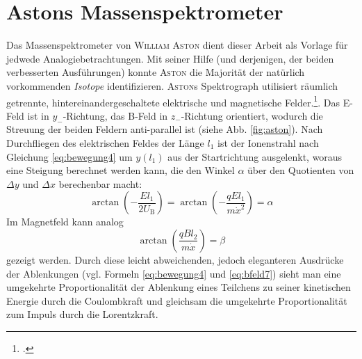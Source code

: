 \section{Astons Massenspektrometer}
\label{sec:aston}
Das Massenspektrometer von \textsc{William Aston} dient dieser Arbeit als Vorlage für jedwede Analogiebetrachtungen. Mit seiner Hilfe (und derjenigen, der beiden verbesserten Ausführungen) konnte \textsc{Aston} die Majorität der natürlich vorkommenden \textit{Isotope} identifizieren.
\textsc{Aston}s Spektrograph utilisiert räumlich getrennte, hintereinandergeschaltete elektrische und magnetische Felder.\footcite[die nachfolgende Herleitung ist in weiten Teilen eine Paraphrasierung von][S.\,51--52]{Demtroeder2010}. Das E-Feld ist in $y_-$-Richtung, das B-Feld in $z_-$-Richtung orientiert, wodurch die Streuung der beiden Feldern anti-parallel ist (siehe Abb. \ref{fig:aston}).
Nach Durchfliegen des elektrischen Feldes der Länge $l_1$ ist der Ionenstrahl nach Gleichung \eqref{eq:bewegung4} um $y(l_1)$ aus der Startrichtung ausgelenkt, woraus eine Steigung berechnet werden kann, die den Winkel $\alpha$ über den Quotienten von $\Delta y$ und $\Delta x$ berechenbar macht:
\begin{equation}
\label{eq:aston1}
\arctan(-\frac{El_1}{2U_\mathrm{B}})=\arctan(-\frac{qEl_1}{m\dot{x}^2})=\alpha
\end{equation}
Im Magnetfeld kann analog
\begin{equation}
\label{eq:aston2}
\arctan(\frac{qBl_2}{m\dot{x}})=\beta
\end{equation}
gezeigt werden. Durch diese leicht abweichenden, jedoch eleganteren Ausdrücke der Ablenkungen (vgl. Formeln \eqref{eq:bewegung4} und \eqref{eq:bfeld7}) sieht man eine umgekehrte Proportionalität der Ablenkung eines Teilchens zu seiner kinetischen Energie durch die Coulombkraft und gleichsam die umgekehrte Proportionalität zum Impuls durch die Lorentzkraft. 

